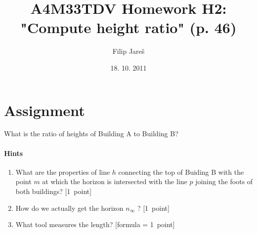\documentclass[11pt,oneside,a4paper,pdftex]{article}   %
\title{A4M33TDV Homework H2: "Compute height ratio" (p. 46)}
\date{18. 10. 2011}
\author{Filip Jareš}
\begin{document}

\maketitle

\section{Assignment}

\noindent What is the ratio of heights of Building A to Building B?

\paragraph{Hints}

\begin{enumerate}
		\item What are the properties of line $h$ connecting the top of Buiding B with the point $m$
			at which the horizon is intersected with the line $p$ joining the foots of both buildings? [1~point]
		\item How do we actually get the horizon $n_\infty$ ? [1~point]
		\item What tool measures the length? [formula = 1~point]
\end{enumerate}


\begin{figure}[htb]
	\centering
	\caption{}
	\label{buildings}
\end{figure}
\end{document}
